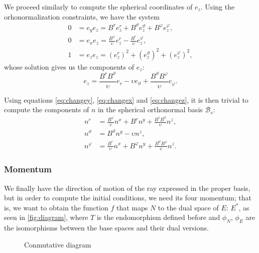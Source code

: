 We proceed similarly to compute the spherical coordinates of $e_z$. Using the orhonormalization constraints, we have the system
\begin{align*}
0 &= e_y e_z = B^r e_z^r + B^\vartheta e_z^\vartheta + B^\varphi e_z^\varphi, \\
0 &= e_x e_z = \frac{B^\varphi}{\upsilon} e_z^r - \frac{B^r}{\upsilon} e_z^\varphi, \\
1 &= e_z e_z = \left(e_z^r\right)^2 + \left(e_z^\vartheta\right)^2 + \left(e_z^\varphi\right)^2,
\end{align*}
whose solution gives us the components of $e_z$:
\begin{equation}
\label{eq:changez}
e_z = \frac{B^r B^\vartheta}{\upsilon} e_r - \upsilon e_\vartheta + \frac{B^\vartheta B^\varphi}{\upsilon} e_\varphi.
\end{equation}

Using equations \ref{eq:changey}, \ref{eq:changex} and \ref{eq:changez}, it is then trivial to compute the components of $n$ in the spherical orthonormal basis $\mathcal{B}_s$:
\begin{align}
n^r &= \frac{B^\varphi}{\upsilon} n^x + B^r n^y + \frac{B^r B^\vartheta}{\upsilon} n^z, \\
n^\vartheta &= B^\vartheta n^y - \upsilon n^z, \\
n^\varphi &= \frac{B^r}{\upsilon} n^x + B^\varphi n^y + \frac{B^\vartheta B^\varphi}{\upsilon} n^z.
\end{align}

\subsubsection*{Momentum}

We finally have the direction of motion of the ray expressed in the proper basis, but in order to compute the initial conditions, we need its four momentum; that is, we want to obtain the function $f$ that maps $N$ to the dual space of $E$: $E^*$, as seen in \autoref{fig:diagram}, where $T$ is the endomorphism defined before and $\phi_N$, $\phi_E$ are the isomorphisms between the base spaces and their dual versions.

\begin{figure}[bth]
	\myfloatalign
	\caption[Conmutative diagram]{Conmutative diagram}
	\label{fig:diagram}
\end{figure}

